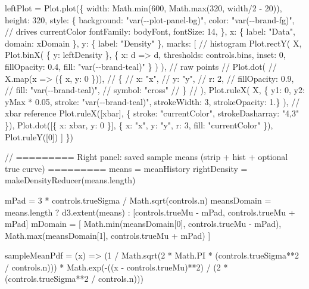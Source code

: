 \documentclass[
  letterpaper,
  DIV=11,
  numbers=noendperiod]{scrreprt}
\newenvironment{Shaded}{\begin{snugshade}}{\end{snugshade}}
\newcommand{\NormalTok}[1]{\textcolor[rgb]{0.00,0.23,0.31}{#1}}
\theoremstyle{definition}
\theoremstyle{plain}
\theoremstyle{definition}
\theoremstyle{remark}
\begin{document}
\begin{Shaded}
\begin{Highlighting}[]
\NormalTok{leftPlot = Plot.plot(\{}
\NormalTok{  width: Math.min(600, Math.max(320, width/2 {-} 20)),}
\NormalTok{  height: 320,}
\NormalTok{  style: \{}
\NormalTok{    background: "var({-}{-}plot{-}panel{-}bg)",}
\NormalTok{    color: "var({-}{-}brand{-}fg)",          // drives \textquotesingle{}currentColor\textquotesingle{}}
\NormalTok{    fontFamily: bodyFont, }
\NormalTok{    fontSize: 14,}
\NormalTok{  \}, }
\NormalTok{  x: \{ label: "Data", domain: xDomain \},}
\NormalTok{  y: \{ label: "Density" \},}
\NormalTok{  marks: [}
\NormalTok{    // histogram}
\NormalTok{    Plot.rectY(}
\NormalTok{      X,}
\NormalTok{      Plot.binX(}
\NormalTok{        \{ y: leftDensity \},}
\NormalTok{        \{}
\NormalTok{          x: d =\textgreater{} d,}
\NormalTok{          thresholds: controls.bins,}
\NormalTok{          inset: 0,}
\NormalTok{          fillOpacity: 0.4,}
\NormalTok{          fill: "var({-}{-}brand{-}teal)"}
\NormalTok{        \}}
\NormalTok{      )}
\NormalTok{    ),}
\NormalTok{    // raw points}
\NormalTok{    // Plot.dot(}
\NormalTok{    //   X.map(x =\textgreater{} (\{ x, y: 0 \})),}
\NormalTok{    //   \{}
\NormalTok{    //     x: "x",}
\NormalTok{    //     y: "y",}
\NormalTok{    //     r: 2,}
\NormalTok{    //     fillOpacity: 0.9,}
\NormalTok{    //     fill: "var({-}{-}brand{-}teal)",}
\NormalTok{    //     symbol: "cross"}
\NormalTok{    //   \}}
\NormalTok{    // ),}
\NormalTok{    Plot.ruleX(}
\NormalTok{    X,}
\NormalTok{    \{ y1: 0, y2: yMax * 0.05, stroke: "var({-}{-}brand{-}teal)", strokeWidth: 3, strokeOpacity: 1.\}}
\NormalTok{    ),}
\NormalTok{    // xbar reference}
\NormalTok{    Plot.ruleX([xbar], \{ stroke: "currentColor", strokeDasharray: "4,3" \}),}
\NormalTok{    Plot.dot([\{ x: xbar, y: 0 \}], \{ x: "x", y: "y", r: 3, fill: "currentColor" \}),}
\NormalTok{    Plot.ruleY([0])}
\NormalTok{  ]}
\NormalTok{\})}

\NormalTok{// ========= Right panel: saved sample means (strip + hist + optional true curve) =========}
\NormalTok{means = meanHistory}
\NormalTok{rightDensity = makeDensityReducer(means.length)}

\NormalTok{mPad = 3 * controls.trueSigma / Math.sqrt(controls.n)}
\NormalTok{meansDomain = means.length ? d3.extent(means) : [controls.trueMu {-} mPad, controls.trueMu + mPad]}
\NormalTok{mDomain = [}
\NormalTok{  Math.min(meansDomain[0], controls.trueMu {-} mPad),}
\NormalTok{  Math.max(meansDomain[1], controls.trueMu + mPad)}
\NormalTok{]}

\NormalTok{sampleMeanPdf = (x) =\textgreater{}}
\NormalTok{  (1 / Math.sqrt(2 * Math.PI * (controls.trueSigma**2 / controls.n))) *}
\NormalTok{  Math.exp({-}((x {-} controls.trueMu)**2) / (2 * (controls.trueSigma**2 / controls.n)))}


\end{Highlighting}
\end{Shaded}
\end{document}
